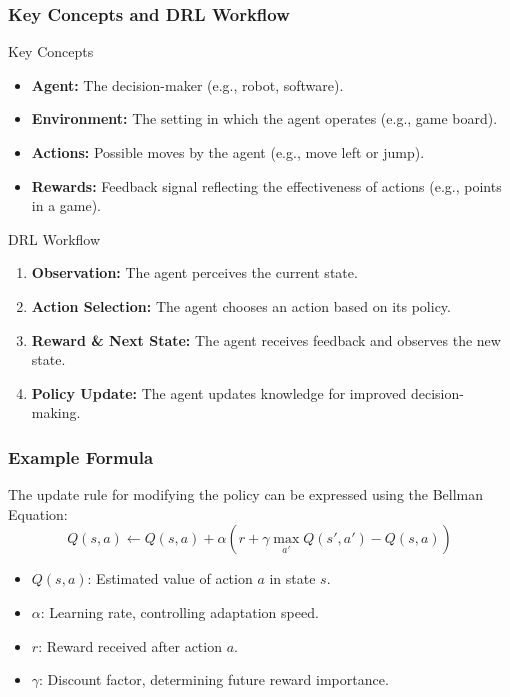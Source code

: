 \documentclass[aspectratio=169]{beamer}
\begin{document}
\begin{frame}[fragile]
    \frametitle{Key Concepts and DRL Workflow}
    \begin{block}{Key Concepts}
        \begin{itemize}
            \item \textbf{Agent:} The decision-maker (e.g., robot, software).
            \item \textbf{Environment:} The setting in which the agent operates (e.g., game board).
            \item \textbf{Actions:} Possible moves by the agent (e.g., move left or jump).
            \item \textbf{Rewards:} Feedback signal reflecting the effectiveness of actions (e.g., points in a game).
        \end{itemize}
    \end{block}

    \begin{block}{DRL Workflow}
        \begin{enumerate}
            \item \textbf{Observation:} The agent perceives the current state.
            \item \textbf{Action Selection:} The agent chooses an action based on its policy.
            \item \textbf{Reward \& Next State:} The agent receives feedback and observes the new state.
            \item \textbf{Policy Update:} The agent updates knowledge for improved decision-making.
        \end{enumerate}
    \end{block}
\end{frame}

\begin{frame}[fragile]
    \frametitle{Example Formula}
    The update rule for modifying the policy can be expressed using the Bellman Equation:
    \begin{equation}
        Q(s, a) \leftarrow Q(s, a) + \alpha \left( r + \gamma \max_{a'} Q(s', a') - Q(s, a) \right)
    \end{equation}
    \begin{itemize}
        \item \(Q(s, a)\): Estimated value of action \(a\) in state \(s\).
        \item \(\alpha\): Learning rate, controlling adaptation speed.
        \item \(r\): Reward received after action \(a\).
        \item \(\gamma\): Discount factor, determining future reward importance.
    \end{itemize}
\end{frame}
\end{document}
